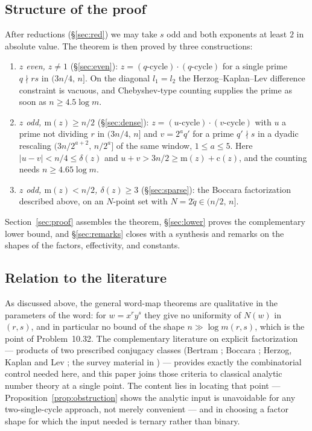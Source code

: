 \documentclass[11pt]{amsart}
\numberwithin{equation}{section}
\theoremstyle{remark}
\newcommand{\md}{\mathrm{m}}   %
\newcommand{\cy}{\mathrm{c}}   %
\begin{document}
\subsection*{Structure of the proof}
After reductions (\S\ref{sec:red}) we may take $s$ odd and both exponents at least
$2$ in absolute value. The theorem is then proved by three constructions:
\begin{enumerate}
\item[(I)] \emph{$z$ even, $z\neq 1$} (\S\ref{sec:even}): $z=(\text{$q$-cycle})
\cdot(\text{$q$-cycle})$ for a single prime $q\nmid rs$ in $(3n/4,\,n]$. On the
diagonal $l_1=l_2$ the Herzog--Kaplan--Lev difference constraint is vacuous, and
Chebyshev-type counting supplies the prime as soon as $n\ge4.5\log m$.
\item[(II)] \emph{$z$ odd, $\md(z)\ge n/2$} (\S\ref{sec:dense}): $z=(\text{$u$-cycle})
\cdot(\text{$v$-cycle})$ with $u$ a prime not dividing $r$ in $(3n/4,\,n]$ and
$v=2^aq'$ for a prime $q'\nmid s$ in a dyadic rescaling
$(3n/2^{a+2},\,n/2^a]$ of the same window, $1\le a\le5$. Here
$|u-v|<n/4\le\delta(z)$ and $u+v>3n/2\ge \md(z)+\cy(z)$, and the counting needs
$n\ge4.65\log m$.
\item[(III)] \emph{$z$ odd, $\md(z)<n/2$, $\delta(z)\ge3$} (\S\ref{sec:sparse}):
the Boccara factorization described above, on an $N$-point set with
$N=2\tilde q\in(n/2,\,n]$.
\end{enumerate}
Section~\ref{sec:proof} assembles the theorem, \S\ref{sec:lower} proves the
complementary lower bound, and \S\ref{sec:remarks} closes with a synthesis and
remarks on the shapes of the factors, effectivity, and constants.

\subsection*{Relation to the literature}
As discussed above, the general word-map theorems \cite{LaSh,LST} are
qualitative in the parameters of the word: for $w=x^ry^s$ they give no
uniformity of $N(w)$ in $(r,s)$, and in particular no bound of the shape
$n\gg\log m(r,s)$, which is the point of Problem~10.32. The complementary
literature on explicit factorization --- products of two prescribed conjugacy
classes (Bertram \cite{Bertram}; Boccara \cite{Boccara82}; Herzog, Kaplan and
Lev \cite{HKL}; the survey material in \cite{Petronio}) --- provides exactly the
combinatorial control needed here, and this paper joins those criteria to
classical analytic number theory at a single point. The content lies in locating
that point --- Proposition~\ref{prop:obstruction} shows the analytic input is
unavoidable for any two-single-cycle approach, not merely convenient --- and in
choosing a factor shape for which the input needed is ternary rather than
binary.
\end{document}
